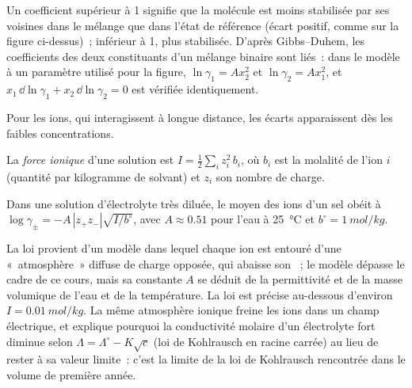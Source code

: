 Un coefficient supérieur à 1 signifie que la molécule est moins stabilisée par ses
voisines dans le mélange que dans l'état de référence (écart positif, comme sur la figure
ci-dessus)~; inférieur à 1, plus stabilisée. D'après Gibbs--Duhem, les coefficients des deux
constituants d'un mélange binaire sont liés~: dans le modèle à un paramètre
utilisé pour la figure, $\ln\gamma_1 = Ax_2^2$ et $\ln\gamma_2 = Ax_1^2$, et
$x_1\,\dd\ln\gamma_1 + x_2\,\dd\ln\gamma_2 = 0$ est vérifiée identiquement.

Pour les ions, qui interagissent à longue distance, les écarts apparaissent dès les faibles
concentrations.

\begin{definition}\label{def:b2:chemical-potential:ionic-strength}
La \emph{force ionique} d'une solution est $I =
\frac12\sum_i z_i^2\,b_i$, où $b_i$ est la molalité de l'ion $i$ (quantité par
kilogramme de solvant) et $z_i$ son nombre de charge.
\end{definition}

\begin{proposition}\label{prop:b2:chemical-potential:debye-huckel}
Dans une solution d'électrolyte très diluée, le  moyen des
ions d'un sel obéit à $\log\gamma_\pm = -A\,|z_+z_-|\sqrt{I/b^\circ}$, avec $A
\approx 0.51$ pour l'eau à \qty{25}{\celsius} et $b^\circ =
\qty{1}{mol/kg}$.
\end{proposition}
\admitted

\begin{remark}\label{rem:b2:chemical-potential:dh-range}
La loi provient d'un modèle dans lequel chaque ion est entouré d'une
«~atmosphère~» diffuse de charge opposée, qui abaisse son ~; le
modèle dépasse le cadre de ce cours, mais sa constante $A$ se déduit de la
permittivité et de la masse volumique de l'eau et de la température. La loi est précise au-dessous
d'environ $I = \qty{0.01}{mol/kg}$. La même atmosphère ionique freine les ions dans
un champ électrique, et explique pourquoi la conductivité molaire d'un électrolyte
fort diminue selon $\Lambda = \Lambda^\circ - K\sqrt c$ (loi de Kohlrausch
en racine carrée) au lieu de rester à sa valeur limite~: c'est la limite de la
loi de Kohlrausch rencontrée dans le volume de première année.
\end{remark}

